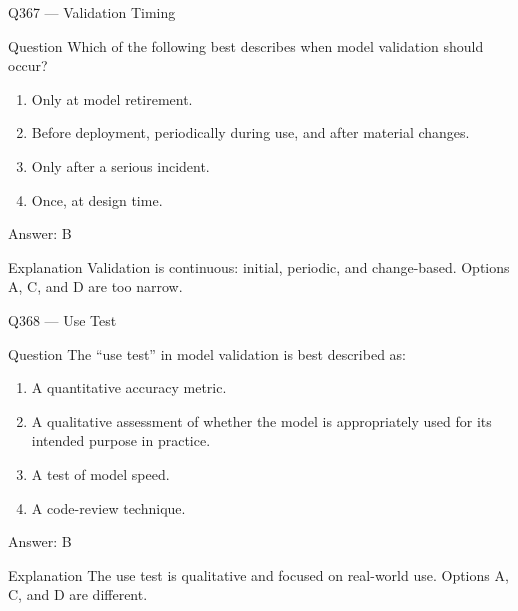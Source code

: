 \documentclass[aspectratio=169,8pt]{beamer}
\begin{document}
	\begin{frame}{Q367 --- Validation Timing}
		\begin{block}{Question}
			Which of the following best describes when model validation should occur?
			\begin{enumerate}
				\item Only at model retirement.
				\item Before deployment, periodically during use, and after material changes.
				\item Only after a serious incident.
				\item Once, at design time.
			\end{enumerate}
		\end{block}
		\begin{exampleblock}{Answer: B}\end{exampleblock}
		\begin{block}{Explanation}
			Validation is continuous: initial, periodic, and change-based. Options A, C, and D are too narrow.
		\end{block}
	\end{frame}
	
	\begin{frame}{Q368 --- Use Test}
		\begin{block}{Question}
			The ``use test'' in model validation is best described as:
			\begin{enumerate}
				\item A quantitative accuracy metric.
				\item A qualitative assessment of whether the model is appropriately used for its intended purpose in practice.
				\item A test of model speed.
				\item A code-review technique.
			\end{enumerate}
		\end{block}
		\begin{exampleblock}{Answer: B}\end{exampleblock}
		\begin{block}{Explanation}
			The use test is qualitative and focused on real-world use. Options A, C, and D are different.
		\end{block}
	\end{frame}
\end{document}

